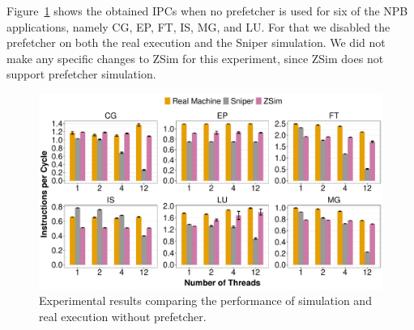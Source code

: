 \documentclass[AMA,final,STIX1COL]{WileyNJD-v2}
\begin{document}
Figure~\ref{fig:sims_nopref} shows the obtained IPCs when no prefetcher is used for six of the NPB applications, namely CG, EP, FT, IS, MG, and LU.
For that we disabled the prefetcher on both the real execution and the Sniper simulation. 
We did not make any specific changes to ZSim for this experiment, since ZSim does not support prefetcher simulation.


\begin{figure}[b]
    \centering
    \includegraphics[width=\linewidth]{figures/fig8.pdf}
    \caption{Experimental results comparing the performance of simulation and real execution without prefetcher.}
    \label{fig:sims_nopref}
\end{figure}
\end{document}
